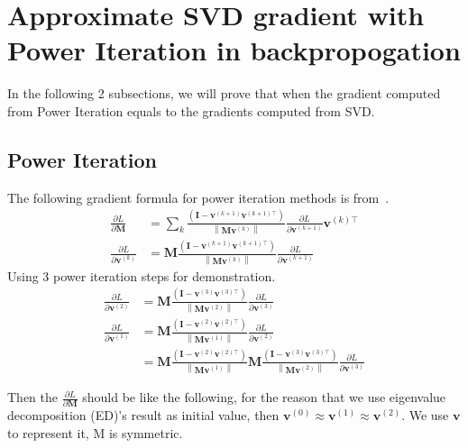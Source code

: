 \documentclass{article}
\newcommand{\bM}{\mathbf{M}}
\newcommand{\bv}{\mathbf{v}}
\newcommand{\bI}{\mathbf{I}}
\begin{document}
\newpage

\section{Approximate SVD gradient with Power Iteration in backpropogation}
In the following 2 subsections, we will prove that when the gradient computed from Power Iteration equals to the gradients computed from SVD.
	\subsection{Power Iteration}
	\label{sec: pi}
	The following gradient formula for power iteration methods is from~\cite{ye2017dynamic}.
	\begin{equation}
	\begin{aligned} 
	\frac{\partial L}{\partial \bM} &=\sum_{k} \frac{\left(\bI-\bv^{(k+1)} \bv^{(k+1)\top}\right)}{\left\|\bM \bv^{(k)}\right\|} \frac{\partial L}{\partial \bv^{(k+1)}} \bv^{(k)\top} \\
	\frac{\partial L}{\partial \bv^{(k)}} &=\bM \frac{\left(\bI-\bv^{(k+1)} \bv^{(k+1)\top}\right)}{\left\|\bM \bv^{(k)}\right\|} \frac{\partial L}{\partial \bv^{(k+1)}} 
	\end{aligned}
	\end{equation}
	Using 3 power iteration steps for demonstration.
	\begin{equation}
	\begin{aligned} 
	\frac{\partial L}{\partial \bv^{(2)}} &=\bM \frac{\left(\bI-\bv^{(3)} \bv^{(3)\top}\right)}{\left\|\bM \bv^{(2)}\right\|} \frac{\partial L}{\partial \bv^{(3)}}\\
	\frac{\partial L}{\partial \bv^{(1)}} &=\bM \frac{\left(\bI-\bv^{(2)} \bv^{(2)\top}\right)}{\left\|\bM \bv^{(1)}\right\|} \frac{\partial L}{\partial \bv^{(2)}}\\
	&=\bM \frac{\left(\bI-\bv^{(2)} \bv^{(2)\top}\right)}{\left\|\bM \bv^{(1)}\right\|} 
	\bM \frac{\left(\bI-\bv^{(3)} \bv^{(3)\top}\right)}{\left\|\bM \bv^{(2)}\right\|} \frac{\partial L}{\partial \bv^{(3)}}
	\end{aligned}
	\end{equation}
	
	Then the $\frac{\partial L}{\partial \bM}$ should be like the following, for the reason that we use eigenvalue decomposition (ED)'s result as initial value, then $\bv^{(0)}\approx\bv^{(1)}\approx\bv^{(2)}$. We use $\bv$ to represent it, M is symmetric.
	
\end{document}
